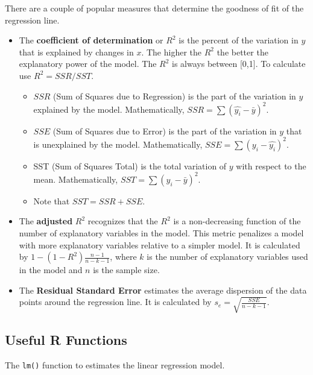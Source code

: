 \documentclass[
  letterpaper,
  DIV=11,
  numbers=noendperiod]{scrreprt}
\begin{document}
There are a couple of popular measures that determine the goodness of
fit of the regression line.

\begin{itemize}
\item
  The \textbf{coefficient of determination} or \(R^2\) is the percent of
  the variation in \(y\) that is explained by changes in \(x\). The
  higher the \(R^2\) the better the explanatory power of the model. The
  \(R^2\) is always between {[}0,1{]}. To calculate use \(R^2=SSR/SST\).

  \begin{itemize}
  \item
    \(SSR\) (Sum of Squares due to Regression) is the part of the
    variation in \(y\) explained by the model. Mathematically,
    \(SSR=\sum{(\hat{y_i}-\bar{y})^2}\).
  \item
    \(SSE\) (Sum of Squares due to Error) is the part of the variation
    in \(y\) that is unexplained by the model. Mathematically,
    \(SSE=\sum{(y_i-\hat{y_i})^2}\).
  \item
    SST (Sum of Squares Total) is the total variation of \(y\) with
    respect to the mean. Mathematically, \(SST=\sum{(y_i-\bar{y})^2}\).
  \item
    Note that \(SST=SSR+SSE\).
  \end{itemize}
\item
  The \textbf{adjusted} \(R^2\) recognizes that the \(R^2\) is a
  non-decreasing function of the number of explanatory variables in the
  model. This metric penalizes a model with more explanatory variables
  relative to a simpler model. It is calculated by
  \(1-(1-R^2) \frac {n-1}{n-k-1}\), where \(k\) is the number of
  explanatory variables used in the model and \(n\) is the sample size.
\item
  The \textbf{Residual Standard Error} estimates the average dispersion
  of the data points around the regression line. It is calculated by
  \(s_e =\sqrt{\frac{SSE}{n-k-1}}\).
\end{itemize}

\hypertarget{useful-r-functions-6}{%
\subsection*{Useful R Functions}\label{useful-r-functions-6}}

The \texttt{lm()} function to estimates the linear regression model.
\end{document}
